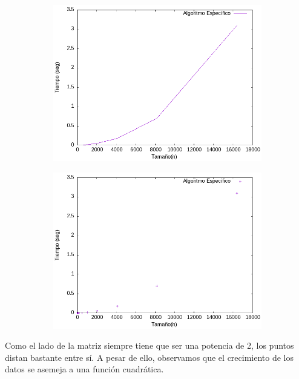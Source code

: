 \documentclass{article}
\begin{document}
    \begin{figure}[H]
	\centering
	\begin{subfigure}{0.4\textwidth}
            \centering
            \includegraphics[scale = 0.40]{P2/lineas.png}
        \end{subfigure}	\hfill
	\begin{subfigure}{0.4\textwidth}
            \centering
            \includegraphics[scale = 0.40]{P2/puntos.png}
        \end{subfigure}
    \end{figure}

    Como el lado de la matriz siempre tiene que ser una potencia de 2, los puntos
    distan bastante entre sí. A pesar de ello, observamos que el crecimiento de
    los datos se asemeja a una función cuadrática. \\
\end{document}

